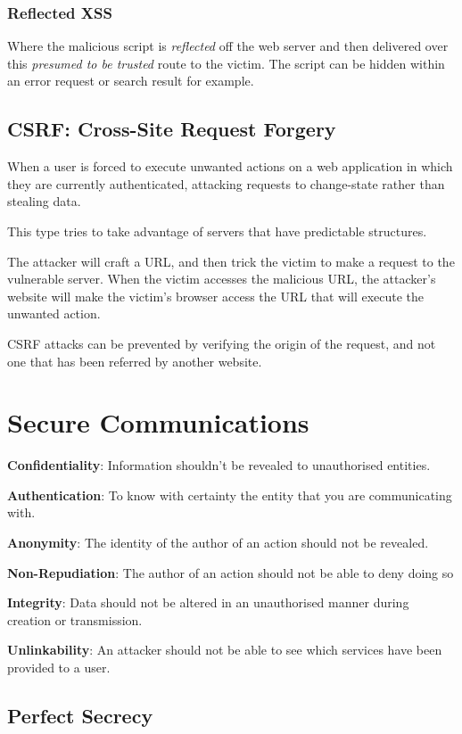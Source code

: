 \documentclass{article}
\begin{document}
\subsubsection{Reflected XSS}

Where the malicious script is \textit{reflected} off the web server and then delivered over this \textit{presumed to be trusted} route to the victim. The script can be hidden within an error request or search result for example.

\subsection{CSRF: Cross-Site Request Forgery}

When a user is forced to execute unwanted actions on a web application in which they are currently authenticated, attacking requests to change-state rather than stealing data.

This type tries to take advantage of servers that have predictable structures.

The attacker will craft a URL, and then trick the victim to make a request to the vulnerable server. When the victim accesses the malicious URL, the attacker's website will make the victim's browser access the URL that will execute the unwanted action.

CSRF attacks can be prevented by verifying the origin of the request, and not one that has been referred by another website.

\section{Secure Communications}

\textbf{Confidentiality}: Information shouldn't be revealed to unauthorised entities.

\textbf{Authentication}: To know with certainty the entity that you are communicating with.

\textbf{Anonymity}: The identity of the author of an action should not be revealed.

\textbf{Non-Repudiation}: The author of an action should not be able to deny doing so

\textbf{Integrity}: Data should not be altered in an unauthorised manner during creation or transmission.

\textbf{Unlinkability}: An attacker should not be able to see which services have been provided to a user.

\subsection{Perfect Secrecy}
\end{document}
